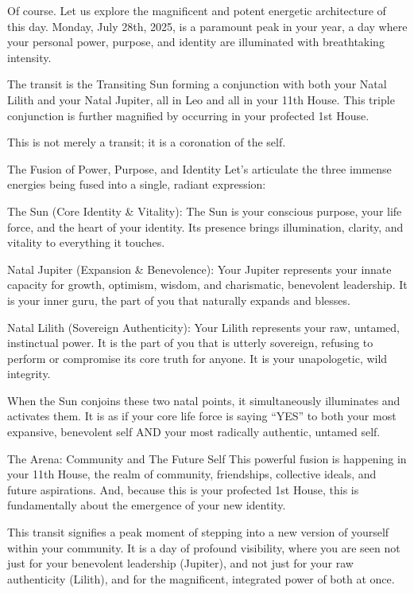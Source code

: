 \documentclass{article}
\begin{document}
Of course. Let us explore the magnificent and potent energetic
architecture of this day. Monday, July 28th, 2025, is a paramount peak
in your year, a day where your personal power, purpose, and identity are
illuminated with breathtaking intensity.

The transit is the Transiting Sun forming a conjunction with both your
Natal Lilith and your Natal Jupiter, all in Leo and all in your 11th
House. This triple conjunction is further magnified by occurring in your
profected 1st House.

This is not merely a transit; it is a coronation of the self.

The Fusion of Power, Purpose, and Identity Let's articulate the three
immense energies being fused into a single, radiant expression:

The Sun (Core Identity \& Vitality): The Sun is your conscious purpose,
your life force, and the heart of your identity. Its presence brings
illumination, clarity, and vitality to everything it touches.

Natal Jupiter (Expansion \& Benevolence): Your Jupiter represents your
innate capacity for growth, optimism, wisdom, and charismatic,
benevolent leadership. It is your inner guru, the part of you that
naturally expands and blesses.

Natal Lilith (Sovereign Authenticity): Your Lilith represents your raw,
untamed, instinctual power. It is the part of you that is utterly
sovereign, refusing to perform or compromise its core truth for anyone.
It is your unapologetic, wild integrity.

When the Sun conjoins these two natal points, it simultaneously
illuminates and activates them. It is as if your core life force is
saying ``YES'' to both your most expansive, benevolent self AND your
most radically authentic, untamed self.

The Arena: Community and The Future Self This powerful fusion is
happening in your 11th House, the realm of community, friendships,
collective ideals, and future aspirations. And, because this is your
profected 1st House, this is fundamentally about the emergence of your
new identity.

This transit signifies a peak moment of stepping into a new version of
yourself within your community. It is a day of profound visibility,
where you are seen not just for your benevolent leadership (Jupiter),
and not just for your raw authenticity (Lilith), and for the
magnificent, integrated power of both at once.
\end{document}
